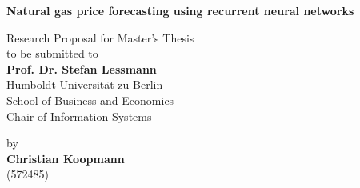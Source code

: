 \begin{center}

    {\Large{\bf Natural gas price forecasting using recurrent neural networks}} \vspace{0.5cm}


    {\normalsize Research Proposal for Master's Thesis \\\vspace{0.5cm}
    to be submitted to}\\\vspace{0.5cm}
    {\normalsize{\bf Prof. Dr. Stefan Lessmann}} \\\vspace{0.5cm}
    {\normalsize Humboldt-Universit\"at zu Berlin \\
    School of Business and Economics \\
    Chair of Information Systems} \vspace{1cm}


    {\normalsize by \\\vspace{0.5cm}
    {\bf Christian Koopmann} \\
    (572485)} \vspace{1cm}


\end{center}
